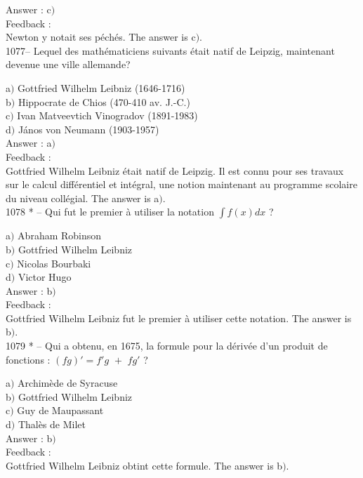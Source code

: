 \documentclass[letterpaper, 12pt]{article}
\begin{document}
Answer : c$)$\\

Feedback : \\
Newton y notait ses p\'ech\'es.
The answer is c$)$.\\

1077-- Lequel des math\'ematiciens suivants \'etait natif de
Leipzig, maintenant devenue une ville allemande?

a$)$ Gottfried Wilhelm Leibniz (1646-1716) \\
b$)$ Hippocrate de Chios (470-410 av. J.-C.) \\
c$)$ Ivan Matveevtich Vinogradov (1891-1983) \\
d$)$ J\'anos von Neumann (1903-1957) \\

Answer : a$)$\\

Feedback : \\
Gottfried Wilhelm Leibniz \'etait natif de Leipzig. Il est connu
pour ses travaux sur le calcul diff\'erentiel et int\'egral, une
notion maintenant au programme scolaire du niveau coll\'egial.
The answer is a$)$.\\

1078 * -- Qui fut le premier \`a utiliser la notation $\int f(x)dx$ ?

a$)$ Abraham Robinson \\
b$)$ Gottfried Wilhelm Leibniz \\
c$)$ Nicolas Bourbaki \\
d$)$ Victor Hugo\\

Answer : b$)$\\

Feedback : \\
Gottfried Wilhelm Leibniz fut le premier \`a utiliser cette
notation.
The answer is b$)$.\\

1079 * -- Qui a obtenu, en 1675, la formule pour la d\'eriv\'ee d'un
produit de fonctions : $(fg)'=f'g\,\,+\,\,fg'$ ?

a$)$ Archim\`ede de Syracuse \\
b$)$ Gottfried Wilhelm Leibniz \\
c$)$ Guy de Maupassant \\
d$)$ Thal\`es de Milet\\

Answer : b$)$\\

Feedback : \\
Gottfried Wilhelm Leibniz obtint cette formule.
The answer is b$)$.\\
\end{document}
